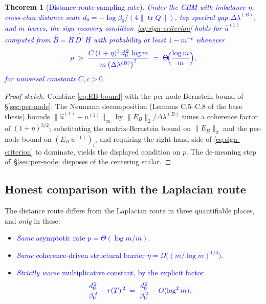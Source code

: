 \documentclass[11pt]{article}
\newcommand{\new}[1]{\textcolor{blue}{#1}}
\newcommand{\newmath}[1]{{\color{blue} #1}}
\newtheorem{theorem}{Theorem}[section]
\theoremstyle{remark}
\newcommand{\1}{\mathbf{1}}
\newcommand{\Tr}{\operatorname{tr}}
\newcommand{\Ddist}{D^{\dagger}}      %
\newcommand{\hatD}{\widehat{\Ddist}}  %
\newcommand{\hatB}{\widehat{B}}
\newcommand{\hatu}{\widehat{u}}
\newcommand{\Hop}{H}                  %
\newcommand{\rT}{r(T)}                %
\begin{document}
\begin{theorem}[\new{Distance-route sampling rate}]
\label{thm:main}
\new{Under the CBM with imbalance $\eta$, cross-clan distance scale
$d_{0} = -\log\beta_{0} / (4\|\Tr Q\|)$, top spectral gap
$\Delta\lambda^{(B)}$, and $m$ leaves, the sign-recovery
condition~\eqref{eq:sign-criterion} holds for $\hatu^{(1)}$ computed from
$\hatB = \Hop\,\hatD\,\Hop$ with probability at least $1 - m^{-c}$
whenever}
\begin{equation}
\newmath{
  p \;>\; \frac{C\,(1 + \eta)^{3}\, d_{0}^{\,2}\, \log m}
                 {m\,\bigl(\Delta\lambda^{(B)}\bigr)^{2}}
       \;=\; \Theta\!\Bigl(\frac{\log m}{m}\Bigr),
}
\end{equation}
\new{for universal constants $C, c > 0$.}
\end{theorem}

\begin{proof}[Proof sketch]
Combine \eqref{eq:EB-bound} with the per-node Bernstein bound of
\S\ref{sec:per-node}.  The Neumann decomposition (Lemmas C.5--C.8 of the
base thesis) bounds $\|\hatu^{(1)} - u^{(1)}\|_{\infty}$ by
$\|E_{B}\|_{2}/\Delta\lambda^{(B)}$ times a coherence factor of
$(1+\eta)^{3/2}$; substituting the matrix-Bernstein bound on
$\|E_{B}\|_{2}$ and the per-node bound on $(E_{B}\,u^{(1)})_{i}$, and
requiring the right-hand side of \eqref{eq:sign-criterion} to dominate,
yields the displayed condition on $p$.  The de-meaning step
of~\S\ref{sec:per-node} disposes of the centering scalar.
\end{proof}

\subsection{Honest comparison with the Laplacian route}

The distance route differs from the Laplacian route in three quantifiable
places, and \emph{only} in these:

\begin{itemize}
  \item \new{\emph{Same} asymptotic rate $p = \Theta(\log m / m)$.}
  \item \new{\emph{Same} coherence-driven structural barrier
        $\eta = \Omega\!\big((m/\log m)^{1/3}\big)$.}
  \item \new{\emph{Strictly worse} multiplicative constant, by the
        explicit factor}
        \begin{equation*}
        \newmath{
          \frac{d_{0}^{\,2}}{\beta_{0}^{\,2}}
          \;\cdot\;
          \rT^{\,2}
          \;=\;
          \frac{d_{0}^{\,2}}{\beta_{0}^{\,2}}
          \;\cdot\;
          O(\log^{2} m).
        }
        \end{equation*}
\end{itemize}
\end{document}
